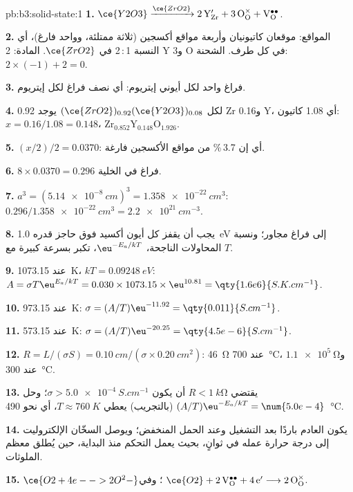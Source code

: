 \begin{solution}{pb:b3:solid-state:1}
\textbf{1.} $\ce{Y2O3} \xrightarrow{\ce{ZrO2}} \mathrm{2\,Y_{Zr}' + 3\,O_O^{\times} + V_O^{\bullet\bullet}}$.

\textbf{2.} المواقع: موقعان كاتيونيان وأربعة مواقع أكسجين (ثلاثة ممتلئة، وواحد فارغ)،
أي النسبة 1\,:\,2 في $\ce{ZrO2}$. المادة: 2 Y و3 O في كل طرف. الشحنة: $2 \times (-1) + 2 = 0$.

\textbf{3.} فراغ واحد لكل أيوني إيتريوم: أي نصف فراغ لكل إيتريوم.

\textbf{4.} لكل $(\ce{ZrO2})_{0.92}(\ce{Y2O3})_{0.08}$ يوجد 0.92 Zr و0.16 Y، أي 1.08 كاتيون: $x = 0.16/1.08 = 0.148$،
$\mathrm{Zr_{0.852}Y_{0.148}O_{1.926}}$.

\textbf{5.} $(x/2)/2 = 0.0370$: أي إن 3.7\,\% من مواقع الأكسجين فارغة.

\textbf{6.} $8 \times 0.0370 = 0.296$ فراغ في الخلية.

\textbf{7.} $a^3 = (\qty{5.14e-8}{cm})^3 = \qty{1.358e-22}{cm^3}$: $0.296/\qty{1.358e-22}{cm^3} = \qty{2.2e21}{cm^{-3}}$.

\textbf{8.} يجب أن يقفز كل أيون أكسيد فوق حاجز قدره \qty{1.0}{eV} إلى فراغ
مجاور؛ ونسبة المحاولات الناجحة، $\eu^{-E_a/kT}$، تكبر بسرعة كبيرة مع $T$.

\textbf{9.} عند \qty{1073.15}{K}، $kT = \qty{0.09248}{eV}$: $A = \sigma T\eu^{E_a/kT} = 0.030 \times 1073.15 \times \eu^{10.81} = \qty{1.6e6}{S.K.cm^{-1}}$.

\textbf{10.} عند \qty{973.15}{K}: $\sigma = (A/T)\eu^{-11.92} = \qty{0.011}{S.cm^{-1}}$.

\textbf{11.} عند \qty{573.15}{K}: $\sigma = (A/T)\eu^{-20.25} = \qty{4.5e-6}{S.cm^{-1}}$.

\textbf{12.} $R = L/(\sigma S) = \qty{0.10}{cm}/(\sigma \times \qty{0.20}{cm^2})$: \qty{46}{\ohm} عند \qty{700}{\celsius}، و$\qty{1.1e5}{\ohm}$ عند \qty{300}{\celsius}.

\textbf{13.} يقتضي $R < \qty{1}{k\ohm}$ أن يكون $\sigma > \qty{5.0e-4}{S.cm^{-1}}$؛ وحل $(A/T)\eu^{-E_a/kT} = \num{5.0e-4}$ (بالتجريب)
يعطي $T \approx \qty{760}{K}$، أي نحو \qty{490}{\celsius}.

\textbf{14.} يكون العادم باردًا بعد التشغيل وعند الحمل المنخفض؛ ويوصل السخّان
الإلكتروليت إلى درجة حرارة عمله في ثوانٍ، بحيث يعمل التحكم
منذ البداية، حين يُطلق معظم الملوثات.

\textbf{15.} $\ce{O2 + 4e- -> 2O^2-}$؛ وفي  $\ce{O2} + \mathrm{2\,V_O^{\bullet\bullet} + 4\,e'} \longrightarrow \mathrm{2\,O_O^{\times}}$.


\end{solution}
